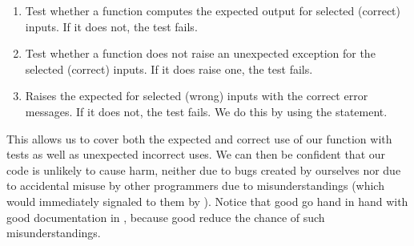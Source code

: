 %
\begin{enumerate}%
%
\item Test whether a function computes the expected output for selected (correct) inputs. %
If it does not, the test fails.%
%
\item Test whether a function does not raise an unexpected exception for the selected (correct) inputs. %
If it does raise one, the test fails.%
%
\item Raises the expected  for selected (wrong) inputs with the correct error messages. %
If it does not, the test fails. %
We do this by using the  statement.%
%
\end{enumerate}%
%
This allows us to cover both the expected and correct use of our function with tests as well as unexpected incorrect uses.
We can then be confident that our code is unlikely to cause harm, neither due to bugs created by ourselves nor due to accidental misuse by other programmers due to misunderstandings (which would immediately signaled to them by ).
Notice that good  go hand in hand with good documentation in , because good  reduce the chance of such misunderstandings.%
%
%
%
\FloatBarrier%
\endhsection%
%
%
\label{sec:builtInExceptions}%
%
